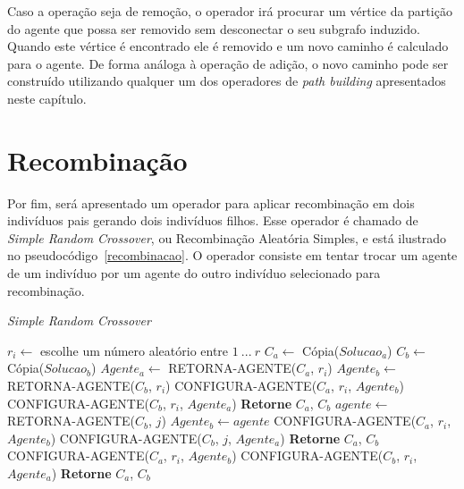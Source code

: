 Caso a operação seja de remoção, o operador irá procurar um vértice da partição 
do agente que possa ser removido sem desconectar o seu subgrafo induzido. Quando 
este vértice é encontrado ele é removido e um novo caminho é calculado para 
o agente. De forma análoga à operação de adição, o novo caminho pode ser 
construído utilizando qualquer um dos operadores de \textit{path building} 
apresentados neste capítulo.

\section{Recombinação}
\label{sec:recombinacao}

Por fim, será apresentado um operador para aplicar recombinação em dois 
indivíduos pais gerando dois indivíduos filhos. Esse operador é chamado de 
\textit{Simple Random Crossover}, ou Recombinação Aleatória Simples, e está 
ilustrado no pseudocódigo~\ref{recombinacao}. O operador consiste em tentar 
trocar um agente de um indivíduo por um agente do outro indivíduo selecionado 
para recombinação.

\begin{algorithm}                   %
	\caption{\textit{Simple Random Crossover}}          %
	\label{recombinacao}                           %
	\begin{algorithmic}[1]                   %
		\newline
		\State $r_{i} \gets $ escolhe um número aleatório entre $1\ ...\ r$
		\State $C_{a} \gets $ Cópia($Solucao_{a}$) 
		\State $C_{b} \gets $ Cópia($Solucao_{b}$) 
		\State $Agente_{a} \gets $ RETORNA-AGENTE($C_{a}$, $r_{i}$)
		\State $Agente_{b} \gets $ RETORNA-AGENTE($C_{b}$, $r_{i}$)
			\State CONFIGURA-AGENTE($C_{a}$, $r_{i}$, $Agente_{b}$)
			\State CONFIGURA-AGENTE($C_{b}$, $r_{i}$, $Agente_{a}$)
			\State \textbf{Retorne} $C_{a}$, $C_{b}$
		\Else
				\State $agente \gets $ RETORNA-AGENTE($C_{b}$, $j$)
					\State $Agente_{b} \gets agente$
					\State CONFIGURA-AGENTE($C_{a}$, $r_{i}$, $Agente_{b}$)
					\State CONFIGURA-AGENTE($C_{b}$, $j$, $Agente_{a}$)
					\State \textbf{Retorne} $C_{a}$, $C_{b}$
				\EndIf
			\EndFor
			\State CONFIGURA-AGENTE($C_{a}$, $r_{i}$, $Agente_{b}$)
			\State CONFIGURA-AGENTE($C_{b}$, $r_{i}$, $Agente_{a}$)
			\State \textbf{Retorne} $C_{a}$, $C_{b}$
		\EndIf
		\EndProcedure
	\end{algorithmic}
\end{algorithm}

